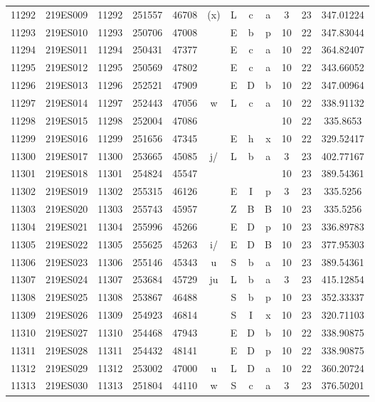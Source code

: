 \begin{tabular}{|*{12}{c|}}
11292 & 219ES009 & 11292 & 251557 & 46708 & (x) & L & c & a & 3 & 23 & 347.01224 \\ 
11293 & 219ES010 & 11293 & 250706 & 47008 &  & E & b & p & 10 & 22 & 347.83044 \\ 
11294 & 219ES011 & 11294 & 250431 & 47377 &  & E & c & a & 10 & 22 & 364.82407 \\ 
11295 & 219ES012 & 11295 & 250569 & 47802 &  & E & c & a & 10 & 22 & 343.66052 \\ 
11296 & 219ES013 & 11296 & 252521 & 47909 &  & E & D & b & 10 & 22 & 347.00964 \\ 
11297 & 219ES014 & 11297 & 252443 & 47056 & w & L & c & a & 10 & 22 & 338.91132 \\ 
11298 & 219ES015 & 11298 & 252004 & 47086 &  &  &  &  & 10 & 22 & 335.8653 \\ 
11299 & 219ES016 & 11299 & 251656 & 47345 &  & E & h & x & 10 & 22 & 329.52417 \\ 
11300 & 219ES017 & 11300 & 253665 & 45085 & j/ & L & b & a & 3 & 23 & 402.77167 \\ 
11301 & 219ES018 & 11301 & 254824 & 45547 &  &  &  &  & 10 & 23 & 389.54361 \\ 
11302 & 219ES019 & 11302 & 255315 & 46126 &  & E & I & p & 3 & 23 & 335.5256 \\ 
11303 & 219ES020 & 11303 & 255743 & 45957 &  & Z & B & B & 10 & 23 & 335.5256 \\ 
11304 & 219ES021 & 11304 & 255996 & 45266 &  & E & D & p & 10 & 23 & 336.89783 \\ 
11305 & 219ES022 & 11305 & 255625 & 45263 & i/ & E & D & B & 10 & 23 & 377.95303 \\ 
11306 & 219ES023 & 11306 & 255146 & 45343 & u & S & b & a & 10 & 23 & 389.54361 \\ 
11307 & 219ES024 & 11307 & 253684 & 45729 & ju & L & b & a & 3 & 23 & 415.12854 \\ 
11308 & 219ES025 & 11308 & 253867 & 46488 &  & S & b & p & 10 & 23 & 352.33337 \\ 
11309 & 219ES026 & 11309 & 254923 & 46814 &  & S & I & x & 10 & 23 & 320.71103 \\ 
11310 & 219ES027 & 11310 & 254468 & 47943 &  & E & D & b & 10 & 22 & 338.90875 \\ 
11311 & 219ES028 & 11311 & 254432 & 48141 &  & E & D & p & 10 & 22 & 338.90875 \\ 
11312 & 219ES029 & 11312 & 253002 & 47000 & u & L & D & a & 10 & 22 & 360.20724 \\ 
11313 & 219ES030 & 11313 & 251804 & 44110 & w & S & c & a & 3 & 23 & 376.50201 \\ 

\end{tabular}
